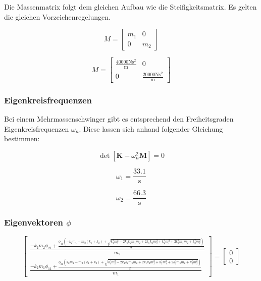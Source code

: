 \documentclass[
  letterpaper,
  DIV=11]{scrreprt}
\begin{document}
Die Massenmatrix folgt dem gleichen Aufbau wie die Steifigkeitsmatrix.
Es gelten die gleichen Vorzeichenregelungen.

\begin{equation*}M = \left[\begin{matrix}m_{1} & 0\\0 & m_{2}\end{matrix}\right]\end{equation*}

\begin{equation*}M = \left[\begin{matrix}\frac{40000 \text{N} \text{s}^{2}}{\text{m}} & 0\\0 & \frac{20000 \text{N} \text{s}^{2}}{\text{m}}\end{matrix}\right]\end{equation*}

\hypertarget{eigenkreisfrequenzen-5}{%
\subsubsection{Eigenkreisfrequenzen}\label{eigenkreisfrequenzen-5}}

Bei einem Mehrmassenschwinger gibt es entsprechend den Freiheitsgraden
Eigenkreisfrequenzen \(\omega_n\). Diese lassen sich anhand folgender
Gleichung bestimmen:

\[\det{[\mathbf{K}-\omega_n^2 \mathbf{M}]=0}\]

\begin{equation*}\omega_{1} = \frac{33.1}{\text{s}}\end{equation*}

\begin{equation*}\omega_{2} = \frac{66.3}{\text{s}}\end{equation*}

\hypertarget{eigenvektoren-phi-3}{%
\subsubsection{\texorpdfstring{Eigenvektoren
\(\phi\)}{Eigenvektoren \textbackslash phi}}\label{eigenvektoren-phi-3}}

\begin{equation*}\left[\begin{matrix}\frac{- k_{2} m_{2} \phi_{21} + \frac{\phi_{11} \left(- k_{2} m_{1} + m_{2} \left(k_{1} + k_{2}\right) + \sqrt{k_{1}^{2} m_{2}^{2} - 2 k_{1} k_{2} m_{1} m_{2} + 2 k_{1} k_{2} m_{2}^{2} + k_{2}^{2} m_{1}^{2} + 2 k_{2}^{2} m_{1} m_{2} + k_{2}^{2} m_{2}^{2}}\right)}{2}}{m_{2}}\\\frac{- k_{2} m_{1} \phi_{11} + \frac{\phi_{21} \left(k_{2} m_{1} - m_{2} \left(k_{1} + k_{2}\right) + \sqrt{k_{1}^{2} m_{2}^{2} - 2 k_{1} k_{2} m_{1} m_{2} + 2 k_{1} k_{2} m_{2}^{2} + k_{2}^{2} m_{1}^{2} + 2 k_{2}^{2} m_{1} m_{2} + k_{2}^{2} m_{2}^{2}}\right)}{2}}{m_{1}}\end{matrix}\right] = \left[\begin{matrix}0\\0\end{matrix}\right]\end{equation*}
\end{document}
